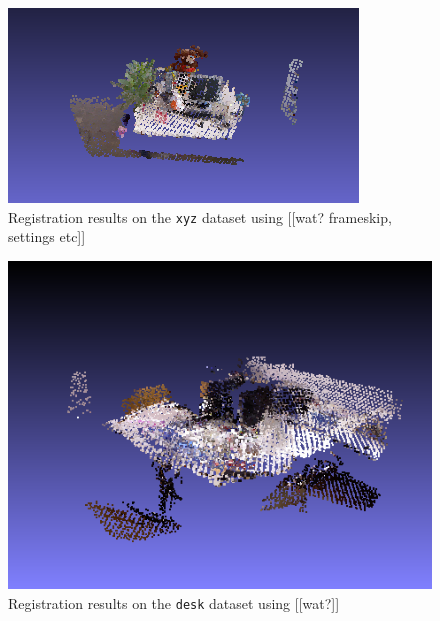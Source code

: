 \documentclass[a4paper]{article}
\begin{document}
\begin{figure}[htbp]
    \centering
        \includegraphics[width=\textwidth]{ims/xyz_results.png}
    \caption{Registration results on the \texttt{xyz} dataset using [[wat? frameskip, settings etc]]}
    \label{fig:xyz_results}
\end{figure}

\begin{figure}[htbp]
    \centering
        \includegraphics[width=\textwidth]{ims/desk_results.png}
    \caption{Registration results on the \texttt{desk} dataset using  [[wat?]]}
    \label{fig:desk_results}
\end{figure}
\end{document}
